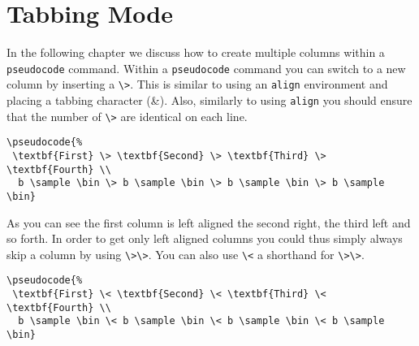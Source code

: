 \documentclass[a4paper]{report}
\begin{document}
\chapter{Tabbing Mode}
\label{chap:tabbing}
\index{\&}
In the following chapter we discuss how to create multiple columns within a \lstinline$pseudocode$ command.
Within a \lstinline$pseudocode$ command you can switch to a new column by inserting a \lstinline$\>$.
This is similar to using an \lstinline$align$ environment and placing a tabbing character (\&). Also,
similarly to using \lstinline$align$ you should ensure that the number of \lstinline$\>$ are identical
on each line.
\begin{center}
\end{center}
\begin{lstlisting}
\pseudocode{%
 \textbf{First} \> \textbf{Second} \> \textbf{Third} \> \textbf{Fourth} \\
  b \sample \bin \> b \sample \bin \> b \sample \bin \> b \sample \bin}
\end{lstlisting}
As you can see the first column is left aligned the second right, the third left and so forth.
In order to get only left aligned columns you could thus simply always skip a column by
using \lstinline$\>\>$. You can also use \lstinline$\<$ a shorthand for \lstinline$\>\>$.
\begin{center}
\end{center}
\begin{lstlisting}
\pseudocode{%
 \textbf{First} \< \textbf{Second} \< \textbf{Third} \< \textbf{Fourth} \\
  b \sample \bin \< b \sample \bin \< b \sample \bin \< b \sample \bin}
\end{lstlisting}
\end{document}
